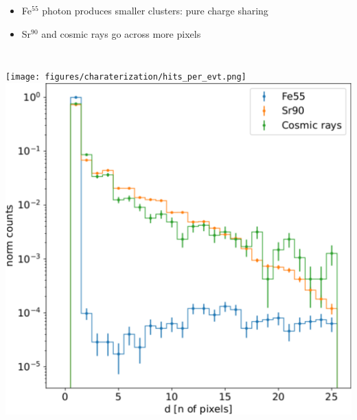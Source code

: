\begin{frame}[noframenumbering]
\begin{columns}
                \begin{itemize}
                    \item Fe$^{55}$ photon produces smaller clusters: pure charge sharing
                    \item Sr$^{90}$ and cosmic rays go across more pixels 
                \end{itemize}    
        \end{columns}
        \medskip
        \begin{columns}
            \texttt{[image: figures/charaterization/hits\_per\_evt.png]}            
            \includegraphics[width=1.\linewidth]{figures/charaterization/cluster_dimension.pdf}
        \end{columns}
    \end{frame}    

